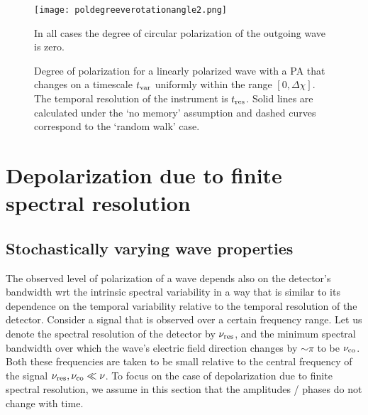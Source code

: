 \documentclass[fleqn,usenatbib]{mnras}
\begin{document}
	
	
	\begin{figure}
		\centering
		\texttt{[image: poldegreeverotationangle2.png]}
		\caption{Degree of polarization for a linearly polarized wave with a PA that changes on a timescale $t_{\rm var}$ uniformly within the range $[0,\Delta \chi]$. The temporal resolution of the instrument is $t_{\rm res}$. Solid lines are calculated under the `no memory' assumption and dashed curves correspond to the `random walk' case.} In all cases the degree of circular polarization of the outgoing wave is zero.
		\label{fig:tempres}
	\end{figure}
	
	\section{Depolarization due to finite spectral resolution}
	\label{sec:nu}
	\subsection{Stochastically varying wave properties}
	\label{sec:nuvar}
	The observed level of polarization of a wave depends also on the detector's bandwidth wrt the intrinsic spectral variability in a way that is similar to its dependence on the temporal variability relative to the temporal resolution of the detector.
	Consider a signal that is observed over a certain frequency range. Let us denote the spectral resolution of the detector by $\nu_{\rm res}$, and the minimum spectral bandwidth over which the wave's electric field direction changes by $\sim\pi$ to be $\nu_{\rm co}$. Both these frequencies are taken to be small relative to the central frequency of the signal $\nu_{\rm res}, \nu_{\rm co}\ll \nu$. To focus on the case of depolarization due to finite spectral resolution, we assume in this section that the amplitudes / phases do not change with time.
	
\end{document}
